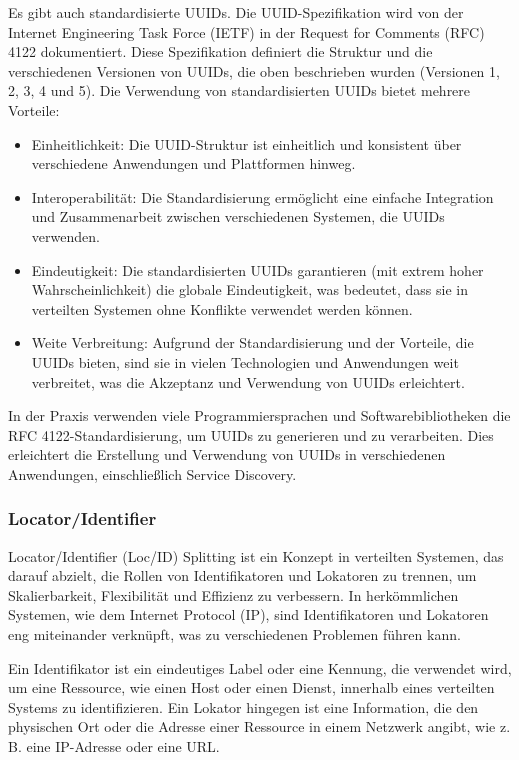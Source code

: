 Es gibt auch standardisierte UUIDs. Die UUID-Spezifikation wird von der Internet Engineering Task Force (IETF) in der Request for Comments (RFC) 4122 dokumentiert. Diese Spezifikation definiert die Struktur und die verschiedenen Versionen von UUIDs, die oben beschrieben wurden (Versionen 1, 2, 3, 4 und 5). Die Verwendung von standardisierten UUIDs bietet mehrere Vorteile:
\begin{itemize}
\item Einheitlichkeit: Die UUID-Struktur ist einheitlich und konsistent über verschiedene Anwendungen und Plattformen hinweg.
\item Interoperabilität: Die Standardisierung ermöglicht eine einfache Integration und Zusammenarbeit zwischen verschiedenen Systemen, die UUIDs verwenden.
\item Eindeutigkeit: Die standardisierten UUIDs garantieren (mit extrem hoher Wahrscheinlichkeit) die globale Eindeutigkeit, was bedeutet, dass sie in verteilten Systemen ohne Konflikte verwendet werden können.
\item Weite Verbreitung: Aufgrund der Standardisierung und der Vorteile, die UUIDs bieten, sind sie in vielen Technologien und Anwendungen weit verbreitet, was die Akzeptanz und Verwendung von UUIDs erleichtert.
\end{itemize}
In der Praxis verwenden viele Programmiersprachen und Softwarebibliotheken die RFC 4122-Standardisierung, um UUIDs zu generieren und zu verarbeiten. Dies erleichtert die Erstellung und Verwendung von UUIDs in verschiedenen Anwendungen, einschließlich Service Discovery.


\subsubsection{Locator/Identifier}

Locator/Identifier (Loc/ID) Splitting ist ein Konzept in verteilten Systemen, das darauf abzielt, die Rollen von Identifikatoren und Lokatoren zu trennen, um Skalierbarkeit, Flexibilität und Effizienz zu verbessern. In herkömmlichen Systemen, wie dem Internet Protocol (IP), sind Identifikatoren und Lokatoren eng miteinander verknüpft, was zu verschiedenen Problemen führen kann.

Ein Identifikator ist ein eindeutiges Label oder eine Kennung, die verwendet wird, um eine Ressource, wie einen Host oder einen Dienst, innerhalb eines verteilten Systems zu identifizieren. Ein Lokator hingegen ist eine Information, die den physischen Ort oder die Adresse einer Ressource in einem Netzwerk angibt, wie z. B. eine IP-Adresse oder eine URL.

